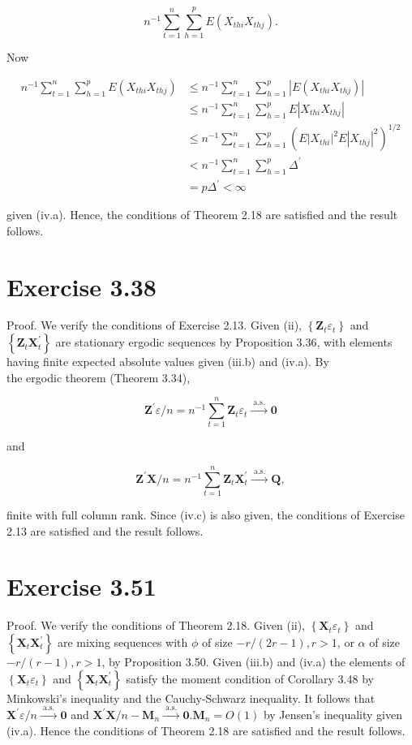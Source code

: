 \documentclass[10pt]{article}
\begin{document}
$$
n^{-1} \sum_{t=1}^{n} \sum_{h=1}^{p} E\left(X_{t h i} X_{t h j}\right) .
$$

Now

$$
\begin{aligned}
n^{-1} \sum_{t=1}^{n} \sum_{h=1}^{p} E\left(X_{t h i} X_{t h j}\right) & \leq n^{-1} \sum_{t=1}^{n} \sum_{h=1}^{p}\left|E\left(X_{t h i} X_{t h j}\right)\right| \\
& \leq n^{-1} \sum_{t=1}^{n} \sum_{h=1}^{p} E\left|X_{t h i} X_{t h j}\right| \\
& \leq n^{-1} \sum_{t=1}^{n} \sum_{h=1}^{p}\left(E\left|X_{t h i}\right|^{2} E\left|X_{t h j}\right|^{2}\right)^{1 / 2} \\
& <n^{-1} \sum_{t=1}^{n} \sum_{h=1}^{p} \Delta^{\prime} \\
& =p \Delta^{\prime}<\infty
\end{aligned}
$$

given (iv.a). Hence, the conditions of Theorem 2.18 are satisfied and the result follows.

\section*{Exercise 3.38}
Proof. We verify the conditions of Exercise 2.13. Given (ii), $\left\{\mathbf{Z}_{t} \varepsilon_{t}\right\}$ and $\left\{\mathbf{Z}_{t} \mathbf{X}_{t}^{\prime}\right\}$ are stationary ergodic sequences by Proposition 3.36, with elements having finite expected absolute values given (iii.b) and (iv.a). By\\
the ergodic theorem (Theorem 3.34),

$$
\mathbf{Z}^{\prime} \varepsilon / n=n^{-1} \sum_{t=1}^{n} \mathbf{Z}_{t} \varepsilon_{t} \xrightarrow{\text { a.s. }} \mathbf{0}
$$

and

$$
\mathbf{Z}^{\prime} \mathbf{X} / n=n^{-1} \sum_{t=1}^{n} \mathbf{Z}_{t} \mathbf{X}_{t}^{\prime} \xrightarrow{\text { a.s. }} \mathbf{Q},
$$

finite with full column rank. Since (iv.c) is also given, the conditions of Exercise 2.13 are satisfied and the result follows.

\section*{Exercise 3.51}
Proof. We verify the conditions of Theorem 2.18. Given (ii), $\left\{\mathbf{X}_{t} \varepsilon_{t}\right\}$ and $\left\{\mathbf{X}_{t} \mathbf{X}_{t}^{\prime}\right\}$ are mixing sequences with $\phi$ of size $-r /(2 r-1), r>1$, or $\alpha$ of size $-r /(r-1), r>1$, by Proposition 3.50. Given (iii.b) and (iv.a) the elements of $\left\{\mathbf{X}_{t} \varepsilon_{t}\right\}$ and $\left\{\mathbf{X}_{t} \mathbf{X}_{t}^{\prime}\right\}$ satisfy the moment condition of Corollary 3.48 by Minkowski's inequality and the Cauchy-Schwarz inequality. It follows that $\mathbf{X}^{\prime} \varepsilon / n \xrightarrow{\text { a.s. }} \mathbf{0}$ and $\mathbf{X}^{\prime} \mathbf{X} / n-\mathbf{M}_{n} \xrightarrow{\text { a.s. }} \mathbf{0} . \mathbf{M}_{n}=O(1)$ by Jensen's inequality given (iv.a). Hence the conditions of Theorem 2.18 are satisfied and the result follows.
\end{document}
